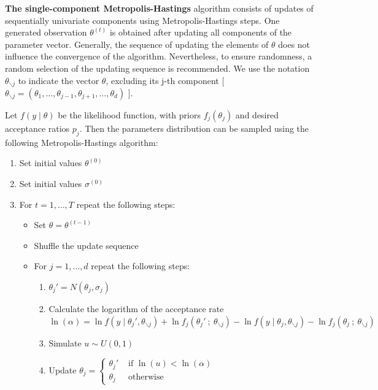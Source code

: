 \documentclass[11pt,fleqn]{book} %
\begin{document}
\textbf{The single-component Metropolis-Hastings} algorithm consists of updates 
of sequentially univariate components using Metropolis-Hastings steps. 
One generated observation $\theta^{(t)}$ is obtained after updating all 
components of the parameter vector. Generally, the sequence of updating the 
elements of $\theta$ does not influence the convergence of the algorithm.
Nevertheless, to ensure randomness, a random selection of the updating 
sequence is recommended. We use the notation $\theta_{\backslash j}$ to 
indicate the vector $\theta$, excluding its j-th component [ $\theta_{\backslash j}
= (\theta_1,\dots,\theta_{j-1},\theta_{j+1},\dots,\theta_{d})$ ].

\begin{algorithm} 
	\label{alg:bimh}
	Let $f(y \mid \theta)$ be the likelihood function, with priors 
	$f_j(\theta_j)$ and desired acceptance ratios $p_j$. Then the 
	parameters distribution can be sampled using the following 
	Metropolis-Hastings algorithm:
	\begin{enumerate}
		\item Set initial values $\theta^{(0)}$
		\item Set initial values $\sigma^{(0)}$
		\item For $t=1,\dots,T$ repeat the following steps:
		\begin{itemize}
			\item Set $\theta=\theta^{(t-1)}$
			\item Shuffle the update sequence
			\item For $j=1,\dots,d$ repeat the following steps:
			\begin{enumerate}[label=\alph*.]
				\item $\theta_j' = N(\theta_j,\sigma_j)$
				\item Calculate the logarithm of the acceptance rate \\
				$\ln(\alpha) = 
					\ln f(y \mid \theta_j',\theta_{\backslash j}) + 
					\ln f_j(\theta_j'\ ;\ \theta_{\backslash j}) - 
					\ln f(y \mid \theta_j,\theta_{\backslash j}) - 
					\ln f_j(\theta_j\ ; \ \theta_{\backslash j})
				$
				\item Simulate $u \sim U(0,1)$
				\item Update $\theta_j=\left\{
				\begin{array}{ll}
					\theta_j' & \text{ if } \ln(u) < \ln(\alpha) \\
					\theta_j  & \text{ otherwise }               
				\end{array}\right.$ 

\end{enumerate}
\end{itemize}
\end{enumerate}
\end{algorithm}
\end{document}
